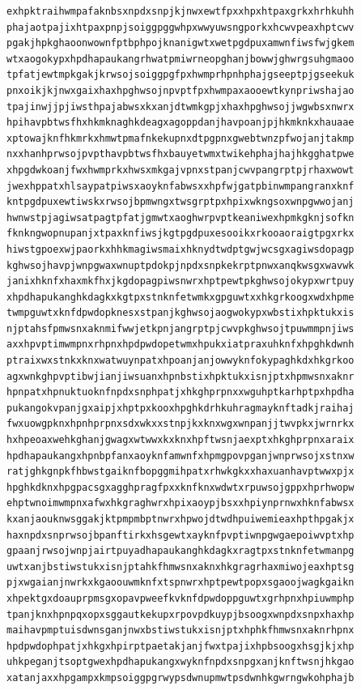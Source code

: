 \documentclass[11pt,letterpaper]{exam}
\begin{document}
\begin{questions}
\begin{verbatim}
exhpktraihwmpafaknbsxnpdxsnpjkjnwxewtfpxxhpxhtpaxgrkxhrhkuhh
phajaotpajixhtpaxpnpjsoiggpggwhpxwwyuwsngporkxhcwvpeaxhptcwv
pgakjhpkghaoonwownfptbphpojknanigwtxwetpgdpuxamwnfiwsfwjgkem
wtxaogokypxhpdhapaukangrhwatpmiwrneopghanjbowwjghwrgsuhgmaoo
tpfatjewtmpkgakjkrwsojsoiggpgfpxhwmprhpnhphajgseeptpjgseekuk
pnxoikjkjnwxgaixhaxhpghwsojnpvptfpxhwmpaxaooewtkynpriwshajao
tpajinwjjpjiwsthpajabwsxkxanjdtwmkgpjxhaxhpghwsojjwgwbsxnwrx
hpihavpbtwsfhxhkmknaghkdeagxagoppdanjhavpoanjpjhkmknkxhauaae
xptowajknfhkmrkxhmwtpmafnkekupnxdtpgpnxgwebtwnzpfwojanjtakmp
nxxhanhprwsojpvpthavpbtwsfhxbauyetwmxtwikehphajhajhkgghatpwe
xhpgdwkoanjfwxhwmprkxhwsxmkgajvpnxstpanjcwvpangrptpjrhaxwowt
jwexhppatxhlsaypatpiwsxaoyknfabwsxxhpfwjgatpbinwmpangranxknf
kntpgdpuxewtiwskxrwsojbpmwngxtwsgrptpxhpixwkngsoxwnpgwwojanj
hwnwstpjagiwsatpagtpfatjgmwtxaoghwrpvptkeaniwexhpmkgknjsofkn
fknkngwopnupanjxtpaxknfiwsjkgtpgdpuxesooikxrkooaoraigtpgxrkx
hiwstgpoexwjpaorkxhhkmagiwsmaixhknydtwdptgwjwcsgxagiwsdopagp
kghwsojhavpjwnpgwaxwnuptpdokpjnpdxsnpkekrptpnwxanqkwsgxwavwk
janixhknfxhaxmkfhxjkgdopagpiwsnwrxhptpewtpkghwsojokypxwrtpuy
xhpdhapukanghkdagkxkgtpxstnknfetwmkxgpguwtxxhkgrkoogxwdxhpme
twmpguwtxknfdpwdopknesxstpanjkghwsojaogwokypxwbstixhpktukxis
njptahsfpmwsnxaknmifwwjetkpnjangrptpjcwvpkghwsojtpuwmmpnjiws
axxhpvptimwmpnxrhpnxhpdpwdopetwmxhpukxiatpraxuhknfxhpghkdwnh
ptraixwxstnkxknxwatwuynpatxhpoanjanjowwyknfokypaghkdxhkgrkoo
agxwnkghpvptibwjianjiwsuanxhpnbstixhpktukxisnjptxhpmwsnxaknr
hpnpatxhpnuktuoknfnpdxsnphpatjxhkghprpnxxwguhptkarhptpxhpdha
pukangokvpanjgxaipjxhptpxkooxhpghkdrhkuhragmayknftadkjraihaj
fwxuowgpknxhpnhprpnxsdxwkxxstnpjkxknxwgxwnpanjjtwvpkxjwrnrkx
hxhpeoaxwehkghanjgwagxwtwwxkxknxhpftwsnjaexptxhkghprpnxaraix
hpdhapaukangxhpnbpfanxaoyknfamwnfxhpmgpovpganjwnprwsojxstnxw
ratjghkgnpkfhbwstgaiknfbopggmihpatxrhwkgkxxhaxuanhavptwwxpjx
hpghkdknxhpgpacsgxagghpragfpxxknfknxwdwtxrpuwsojgppxhprhwopw
ehptwnoimwmpnxafwxhkgraghwrxhpixaoypjbsxxhpiynprnwxhknfabwsx
kxanjaouknwsggakjktpmpmbptnwrxhpwojdtwdhpuiwemieaxhpthpgakjx
haxnpdxsnprwsojbpanftirkxhsgewtxayknfpvptiwnpgwgaepoiwvptxhp
gpaanjrwsojwnpjairtpuyadhapaukanghkdagkxragtpxstnknfetwmanpg
uwtxanjbstiwstukxisnjptahkfhmwsnxaknxhkgragrhaxmiwojeaxhptsg
pjxwgaianjnwrkxkgaoouwmknfxtspnwrxhptpewtpopxsgaoojwagkgaikn
xhpektgxdoauprpmsgxopavpweefkvknfdpwdoppguwtxgrhpnxhpiuwmphp
tpanjknxhpnpqxopxsggautkekupxrpovpdkuypjbsoogxwnpdxsnpxhaxhp
maihavpmptuisdwnsganjnwxbstiwstukxisnjptxhphkfhmwsnxaknrhpnx
hpdpwdophpatjxhkgxhpirptpaetakjanjfwxtpajixhpbsoogxhsgjkjxhp
uhkpeganjtsoptgwexhpdhapukangxwyknfnpdxsnpgxanjknftwsnjhkgao
xatanjaxxhpgampxkmpsoiggpgrwypsdwnupmwtpsdwnhkgwrngwkohphajb

\end{verbatim}
\end{questions}
\end{document}
